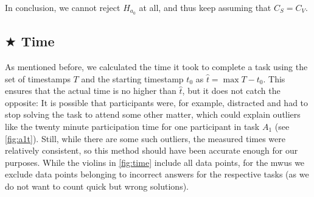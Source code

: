 \documentclass[../thesis]{subfiles}
\begin{document}
In conclusion, we cannot reject $H_{a_0}$ at all, and thus keep assuming that $C_S = C_V$.

\subsection{$\bigstar$ Time}\label{subsec:time}
As mentioned before, we calculated the time it took to complete a task using the set of timestamps $T$ and the starting timestamp $t_0$ as $\hat{t} = \max T - t_0$.
This ensures that the actual time is no higher than $\hat{t}$, but it does not catch the opposite:
It is possible that participants were, for example, distracted and had to stop solving the task to attend some other matter, which could explain outliers like the twenty minute participation time for one participant in task $A_1$ (see \cref{fig:a1t}).
Still, while there are some such outliers, the measured times were relatively consistent, so this method should have been accurate enough for our purposes.
While the \glspl{violin} in \cref{fig:time} include all data points, for the \glspl{mwu} we exclude data points belonging to incorrect answers for the respective tasks (as we do not want to count quick but wrong solutions).
\end{document}
